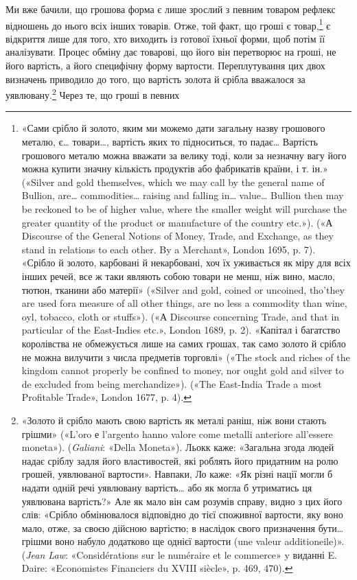 Ми вже бачили, що грошова форма є лише зрослий з певним
товаром рефлекс відношень до нього всіх інших товарів. Отже,
той факт, що гроші є товар,\footnote{
«Сами срібло й золото, яким ми можемо дати загальну назву грошового
металю, є\dots{} товари\dots{}, вартість яких то підноситься, то падає\dots{}
Вартість грошового металю можна вважати за велику тоді, коли за
незначну вагу його можна купити значну кількість продуктів або фабрикатів
 країни, і т. ін.» («Silver and gold themselves, which we may call
by the general name of Bullion, are\dots{} commodities\dots{} raising and falling
in\dots{} value\dots{} Bullion then may be reckoned to be of higher value, where
the smaller weight will purchase the greater quantity of the product or
manufacture of the country etc.»). («А Discourse of the General Notions
of Money, Trade, and Exchange, as they stand in relations to each other.
By a Merchant», London 1695, p. 7). «Срібло й золото, карбовані й некарбовані,
хоч їх уживається як міру для всіх інших речей, все ж таки
являють собою товари не менш, ніж вино, масло, тютюн, тканини або матерії»
(«Silver and gold, coined or uncoined, tho’they are used fora measure
of all other things, are no less a commodity than wine, oyl, tobacco,
cloth or stuffs»). («А Discourse concerning Trade, and that in particular
of the East-Indies etc.», London 1689, p. 2). «Капітал і багатство королівства
не обмежується лише на самих грошах, так само золото й срібло
не можна вилучити з числа предметів торговлі» («The stock and riches
of the kingdom cannot properly be confined to money, nor ought gold and
silver to de excluded from being merchandize»). («The East-India Trade
a most Profitable Trade», London 1677, p. 4).
} є відкриття лише для того, хто
виходить із готової їхньої форми, щоб потім її аналізувати. Процес
обміну дає товарові, що його він перетворює на гроші, не його
вартість, а його специфічну форму вартости. Переплутування
цих двох визначень приводило до того, що вартість золота й
срібла вважалося за уявлювану.\footnote{
«Золото й срібло мають свою вартість як металі раніш, ніж вони
стають грішми» («L’oro е l’argento hanno valore come metalli anteriore
all’essere moneta»). (\emph{Galiani}: «Della Moneta»). Льокк каже: «Загальна
згода людей надає сріблу задля його властивостей, які роблять
його придатним на ролю грошей, уявлюваної вартости». Навпаки, Ло
каже: «Як різні нації могли б надати одній речі уявлювану вартість\dots{}
або як могла б утриматись ця уявлювана вартість?» Але як мало він сам
розумів справу, видно з цих його слів: «Срібло обмінювалося відповідно
до тієї споживної вартости, яку воно мало, отже, за своєю дійсною вартістю;
в наслідок свого призначення бути\dots{} грішми воно набуло додатково
ще однієї вартости (une valeur additioneile)». (\emph{Jean Law}: «Considérations
sur le numéraire et le commerce» y виданні E. Daire: «Economistes
Financiers du XVIII siècle», p. 469, 470).
} Через те, що гроші в певних
